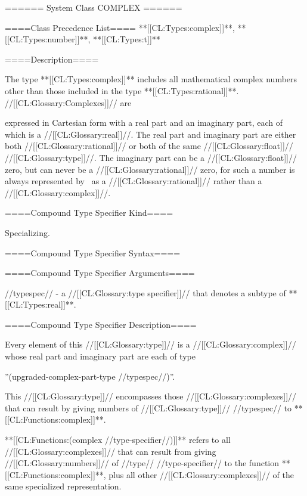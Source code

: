 ====== System Class COMPLEX ======

====Class Precedence List==== **[[CL:Types:complex]]**, **[[CL:Types:number]]**, **[[CL:Types:t]]**

====Description====

The type **[[CL:Types:complex]]** includes all mathematical complex numbers other than those included in the type **[[CL:Types:rational]]**. //[[CL:Glossary:Complexes]]// are

expressed in Cartesian form with a real part and an imaginary part, each of which is a //[[CL:Glossary:real]]//. The real part and imaginary part are either both //[[CL:Glossary:rational]]// or both of the same //[[CL:Glossary:float]]// //[[CL:Glossary:type]]//. The imaginary part can be a //[[CL:Glossary:float]]// zero, but can never be a //[[CL:Glossary:rational]]// zero, for such a number is always represented by \clisp\ as a //[[CL:Glossary:rational]]// rather than a //[[CL:Glossary:complex]]//.

====Compound Type Specifier Kind====

Specializing.

====Compound Type Specifier Syntax====


====Compound Type Specifier Arguments====

//typespec// - a //[[CL:Glossary:type specifier]]// that denotes a subtype of **[[CL:Types:real]]**.

====Compound Type Specifier Description====


Every element of this //[[CL:Glossary:type]]// is a //[[CL:Glossary:complex]]// whose real part and imaginary part are each of type

''(upgraded-complex-part-type //typespec//)''.

This //[[CL:Glossary:type]]// encompasses those //[[CL:Glossary:complexes]]// that can result by giving numbers of //[[CL:Glossary:type]]// //typespec// to **[[CL:Functions:complex]]**.

**[[CL:Functions:(complex //type-specifier//)]]** refers to all //[[CL:Glossary:complexes]]// that can result from giving //[[CL:Glossary:numbers]]// of //type// //type-specifier// to the function **[[CL:Functions:complex]]**, plus all other //[[CL:Glossary:complexes]]// of the same specialized representation.



